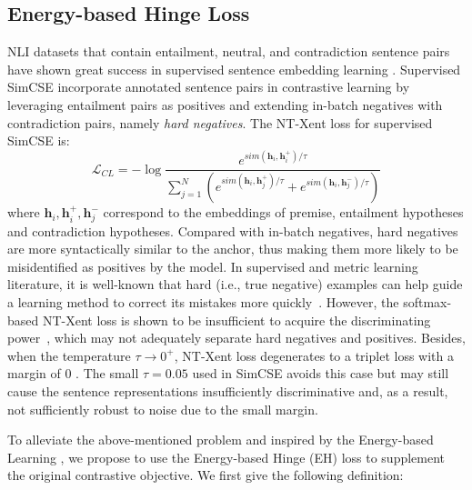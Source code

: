 \documentclass[11pt]{article}
\begin{document}
\subsection{Energy-based Hinge Loss}
\label{sec: eh loss}
NLI datasets \cite{snli, mnli} that contain entailment, neutral, and contradiction sentence pairs have shown great success in supervised sentence embedding learning \cite{ConneauKSBB17USE, ReimersG19sbert}.
Supervised SimCSE incorporate annotated sentence pairs in contrastive learning by leveraging entailment pairs as positives and extending in-batch negatives with contradiction pairs, namely \textit{hard negatives}.
The NT-Xent loss for supervised SimCSE is:
\begin{equation}
\mathcal{L}_{CL}=-\log\frac{e^{sim(\textbf{h}_{i}, \textbf{h}_{i}^+)/\tau}}{\sum_{j=1}^N(e^{sim(\textbf{h}_{i}, \textbf{h}_{j}^+)/\tau}+e^{sim(\textbf{h}_{i}, \textbf{h}_{j}^-)/\tau})}
\label{equation: contrastive_sup}
\end{equation}
where $\textbf{h}_{i}, \textbf{h}_{i}^+, \textbf{h}_{j}^-$ correspond to the embeddings of premise, entailment hypotheses and contradiction hypotheses. 
Compared with in-batch negatives, hard negatives are more syntactically similar to the anchor, thus making them more likely to be misidentified as positives by the model.
In supervised and metric learning literature, it is well-known that hard (i.e., true negative) examples can help guide a learning method to correct its mistakes more quickly~\cite{DBLP:conf/cvpr/SchroffKP15, DBLP:conf/cvpr/SongXJS16}.
However, the softmax-based NT-Xent loss is shown to be insufficient to acquire the discriminating power~\cite{DBLP:conf/cvpr/WangWZJGZL018,DBLP:conf/cvpr/DengGXZ19}, which may not adequately separate hard negatives and positives.
Besides, when the temperature $\tau \rightarrow 0^+$, NT-Xent loss degenerates to a triplet loss with a margin of 0 \cite{WangL21a_understandcl}. The small $\tau=0.05$ used in SimCSE avoids this case but may still cause the sentence representations insufficiently discriminative and, as a result, not sufficiently robust to noise due to the small margin.  

To alleviate the above-mentioned problem and inspired by the Energy-based Learning \cite{lecun2006tutorial}, we propose to use the Energy-based Hinge (EH) loss to supplement the original contrastive objective. We first give the following definition:
\end{document}
